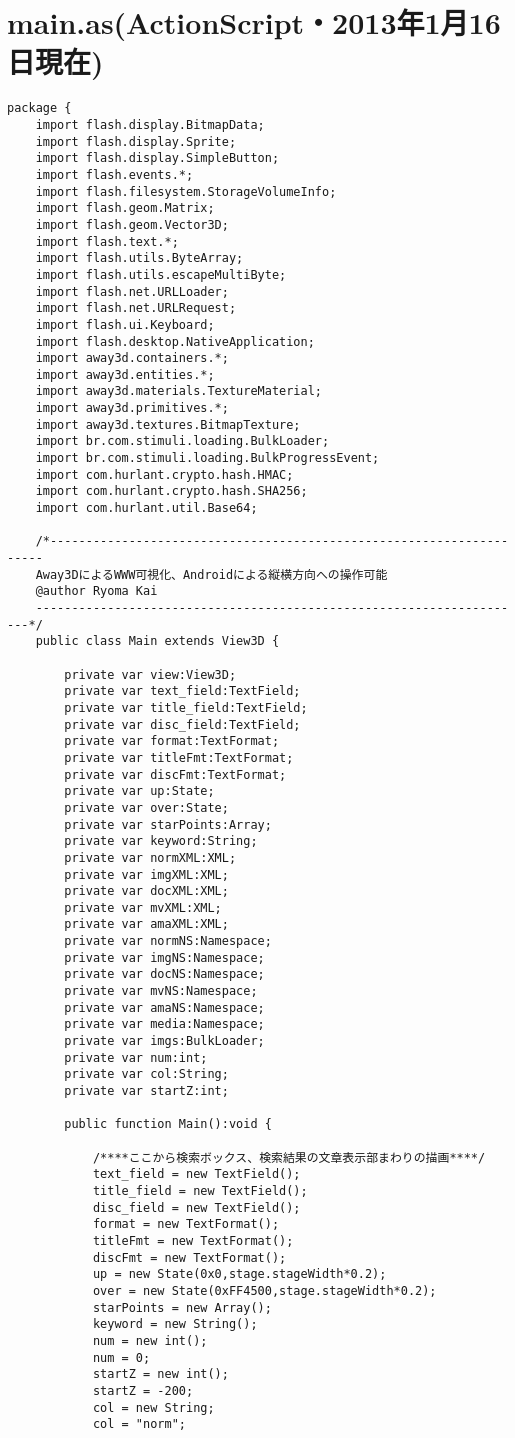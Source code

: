\section{main.as(ActionScript・2013年1月16日現在)}
{\scriptsize
\begin{verbatim}
package {
	import flash.display.BitmapData;
	import flash.display.Sprite;
	import flash.display.SimpleButton;
	import flash.events.*;
	import flash.filesystem.StorageVolumeInfo;
	import flash.geom.Matrix;
	import flash.geom.Vector3D;
	import flash.text.*;
	import flash.utils.ByteArray;
	import flash.utils.escapeMultiByte;
	import flash.net.URLLoader;
	import flash.net.URLRequest;
	import flash.ui.Keyboard;
	import flash.desktop.NativeApplication;
	import away3d.containers.*;
	import away3d.entities.*;
	import away3d.materials.TextureMaterial;
	import away3d.primitives.*;
	import away3d.textures.BitmapTexture;
	import br.com.stimuli.loading.BulkLoader;
	import br.com.stimuli.loading.BulkProgressEvent;
	import com.hurlant.crypto.hash.HMAC;
	import com.hurlant.crypto.hash.SHA256;
	import com.hurlant.util.Base64;

	/*---------------------------------------------------------------------
	Away3DによるWWW可視化、Androidによる縦横方向への操作可能
	@author Ryoma Kai
	---------------------------------------------------------------------*/
	public class Main extends View3D {
		
		private var view:View3D;
		private var text_field:TextField;
		private var title_field:TextField;
		private var disc_field:TextField;
		private var format:TextFormat;
		private var titleFmt:TextFormat;
		private var discFmt:TextFormat;
		private var up:State;
		private var over:State;
		private var starPoints:Array;
		private var keyword:String;
		private var normXML:XML;
		private var imgXML:XML;
		private var docXML:XML;
		private var mvXML:XML;
		private var amaXML:XML;
		private var normNS:Namespace;
		private var imgNS:Namespace;
		private var docNS:Namespace;
		private var mvNS:Namespace;
		private var amaNS:Namespace;
		private var media:Namespace;
		private var imgs:BulkLoader;
		private var num:int;
		private var col:String;
		private var startZ:int;

		public function Main():void {

			/****ここから検索ボックス、検索結果の文章表示部まわりの描画****/
			text_field = new TextField();
			title_field = new TextField();
			disc_field = new TextField();
			format = new TextFormat();
			titleFmt = new TextFormat();
			discFmt = new TextFormat();
			up = new State(0x0,stage.stageWidth*0.2);
			over = new State(0xFF4500,stage.stageWidth*0.2);
			starPoints = new Array();
			keyword = new String();
			num = new int();
			num = 0;
			startZ = new int();
			startZ = -200;
			col = new String;
			col = "norm";
			

\end{verbatim}}
